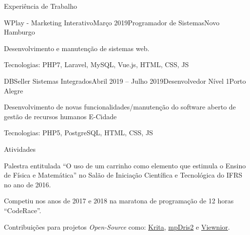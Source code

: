 \documentclass{resume} %
\begin{document}


\begin{rSection}{Experiência de Trabalho}

\begin{rSubsection}{WPlay - Marketing Interativo}{Março 2019}{Programador de Sistemas}{Novo Hamburgo}
\item Desenvolvimento e manutenção de sistemas web.
\item Tecnologias: PHP7, Laravel, MySQL, Vue.js, HTML, CSS, JS
\end{rSubsection}

\begin{rSubsection}{DBSeller Sistemas Integrados}{Abril 2019 -- Julho 2019}{Desenvolvedor Nível 1}{Porto Alegre}
\item Desenvolvimento de novas funcionalidades/manutenção do software aberto de gestão de recursos humanos E-Cidade
\item Tecnologias: PHP5, PostgreSQL, HTML, CSS, JS
\end{rSubsection}

\end{rSection}


\begin{rSection}{Atividades}
 
 Palestra entitulada ``O uso de um carrinho como elemento que estimula o Ensino de Física e Matemática'' no Salão de
 Iniciação Científica e Tecnológica do IFRS no ano de 2016.
 
 Competiu nos anos de 2017 e 2018 na maratona de programação de 12 horas ``CodeRace''.
 
 Contribuições para projetos \textit{Open-Source} como: \href{https://github.com/KDE/krita/commits?author=PietroCarrara}{Krita},
 \href{https://github.com/eonpatapon/mpDris2/commits?author=PietroCarrara}{mpDris2} e
 \href{https://github.com/hellosiyan/Viewnior/commits?author=PietroCarrara}{Viewnior}.
\end{rSection}
\end{document}
